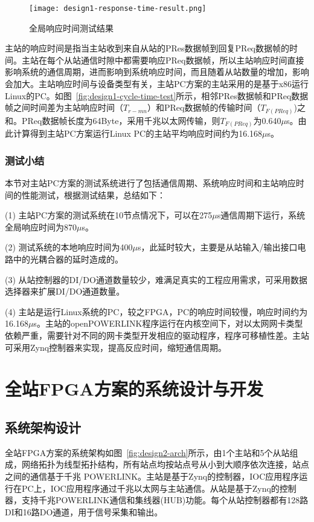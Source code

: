 \begin{figure}[!htb]
  \centering
  \texttt{[image: design1-response-time-result.png]}
  \caption{全局响应时间测试结果}
  \label{fig:design1-response-time-result}
\end{figure}

主站的响应时间是指当主站收到来自从站的PRes数据帧到回复PReq数据帧的时间。主站在每个从站通信时隙中都需要响应PReq数据帧，所以主站响应时间直接影响系统的通信周期，进而影响到系统响应时间，而且随着从站数量的增加，影响会加大。主站响应时间与设备类型有关，主站PC方案的主站采用的是基于x86运行Linux的PC。如图~\ref{fig:design1-cycle-time-test}所示，相邻PRes数据帧和PReq数据帧之间时间差为主站响应时间（$T_{r-mn}$）和PReq数据帧的传输时间（$T_{F(PReq)}$)之和。PReq数据帧长度为64Byte，采用千兆以太网传输，则$T_{F(PReq)}$为0.640$\mu$s。由此计算得到主站PC方案运行Linux PC的主站平均响应时间约为16.168$\mu$s。

\subsubsection{测试小结}
本节对主站PC方案的测试系统进行了包括通信周期、系统响应时间和主站响应时间的性能测试，根据测试结果，总结如下：

(1) 主站PC方案的测试系统在10节点情况下，可以在275$\mu$s通信周期下运行，系统全局响应时间为870$\mu$s。

(2) 测试系统的本地响应时间为400$\mu$s，此延时较大，主要是从站输入/输出接口电路中的光耦合器的延时造成的。

(3) 从站控制器的DI/DO通道数量较少，难满足真实的工程应用需求，可采用数据选择器来扩展DI/DO通道数量。

(4) 主站是运行Linux系统的PC，较之FPGA，PC的响应时间较慢，响应时间约为16.168$\mu$s。主站的openPOWERLINK程序运行在内核空间下，对以太网网卡类型依赖严重，需要针对不同的网卡类型开发相应的驱动程序，程序可移植性差。主站可采用Zynq控制器来实现，提高反应时间，缩短通信周期。

\section{全站FPGA方案的系统设计与开发}
\label{section:全站FPGA方案的系统设计与开发}

\subsection{系统架构设计}
\label{subsection:全站FPGA方案系统架构设计}
全站FPGA方案的系统架构如图~\ref{fig:design2-arch}所示，由1个主站和5个从站组成，网络拓扑为线型拓扑结构，所有站点均按站点号从小到大顺序依次连接，站点之间的通信基于千兆 POWERLINK。主站是基于Zynq的控制器，IOC应用程序运行在PC上，IOC应用程序通过千兆以太网与主站通信。从站是基于Zynq的控制器，支持千兆POWERLINK通信和集线器(HUB)功能。每个从站控制器都有128路DI和16路DO通道，用于信号采集和输出。

